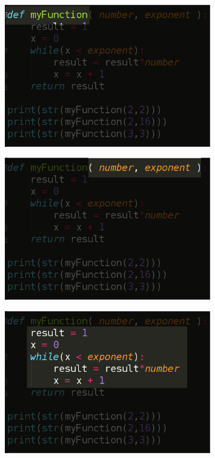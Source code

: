\documentclass{beamer}
\begin{document}
\begin{frame}
\begin{figure}[h]
\includegraphics[width=0.8\textwidth]{myfunc2}
\end{figure}
\end{frame}

\begin{frame}
\begin{figure}[h]
\includegraphics[width=0.8\textwidth]{myfunc3}
\end{figure}
\end{frame}

\begin{frame}
\begin{figure}[h]
\includegraphics[width=0.8\textwidth]{myfunc4}
\end{figure}
\end{frame}
\end{document}
